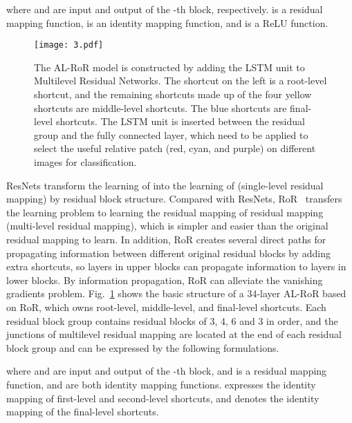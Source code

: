 \documentclass[journal]{IEEEtran}
\begin{document}
where  and  are input and output of the -th block, respectively.  is a residual mapping function,  is an identity mapping function, and  is a ReLU function.

\begin{figure}
\centering
\texttt{[image: 3.pdf]}
\caption{The AL-RoR model is constructed by adding the LSTM unit to Multilevel Residual Networks. The shortcut on the left is a root-level shortcut, and the remaining shortcuts made up of the four yellow shortcuts are middle-level shortcuts. The blue shortcuts are final-level shortcuts. The LSTM unit is inserted between the residual group and the fully connected layer, which need to be applied to select the useful relative patch (red, cyan, and purple) on different images for classification.}
\label{fig:AL-RoR}
\end{figure}
ResNets transform the learning of  into the learning of  (single-level residual mapping) by residual block structure. Compared with ResNets, RoR~\cite{ref-15} transfers the learning problem to learning the residual mapping of residual mapping (multi-level residual mapping), which is simpler and easier than the original residual mapping to learn. In addition, RoR creates several direct paths for propagating information between different original residual blocks by adding extra shortcuts, so layers in upper blocks can propagate information to layers in lower blocks. By information propagation, RoR can alleviate the vanishing gradients problem. Fig.~\ref{fig:AL-RoR} shows the basic structure of a 34-layer AL-RoR based on RoR, which owns root-level, middle-level, and final-level shortcuts. Each residual block group contains residual blocks of 3, 4, 6 and 3 in order, and the junctions of multilevel residual mapping are located at the end of each residual block group and can be expressed by the following formulations.

where  and  are input and output of the -th block, and  is a residual mapping function,  and  are both identity mapping functions.  expresses the identity mapping of first-level and second-level shortcuts, and  denotes the identity mapping of the final-level shortcuts.
\end{document}
